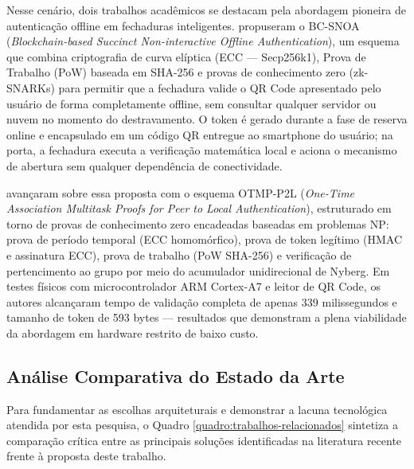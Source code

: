 Nesse cenário, dois trabalhos acadêmicos se destacam pela abordagem pioneira de autenticação offline em fechaduras inteligentes.  propuseram o BC-SNOA (\textit{Blockchain-based Succinct Non-interactive Offline Authentication}), um esquema que combina criptografia de curva elíptica (ECC --- Secp256k1), Prova de Trabalho (PoW) baseada em SHA-256 e provas de conhecimento zero (zk-SNARKs) para permitir que a fechadura valide o QR Code apresentado pelo usuário de forma completamente offline, sem consultar qualquer servidor ou nuvem no momento do destravamento. O token é gerado durante a fase de reserva online e encapsulado em um código QR entregue ao smartphone do usuário; na porta, a fechadura executa a verificação matemática local e aciona o mecanismo de abertura sem qualquer dependência de conectividade.

 avançaram sobre essa proposta com o esquema OTMP-P2L (\textit{One-Time Association Multitask Proofs for Peer to Local Authentication}), estruturado em torno de provas de conhecimento zero encadeadas baseadas em problemas NP: prova de período temporal (ECC homomórfico), prova de token legítimo (HMAC e assinatura ECC), prova de trabalho (PoW SHA-256) e verificação de pertencimento ao grupo por meio do acumulador unidirecional de Nyberg. Em testes físicos com microcontrolador ARM Cortex-A7 e leitor de QR Code, os autores alcançaram tempo de validação completa de apenas 339 milissegundos e tamanho de token de 593 bytes --- resultados que demonstram a plena viabilidade da abordagem em hardware restrito de baixo custo.


\subsection{Análise Comparativa do Estado da Arte}
\label{subsec:trabalhos-relacionados}

Para fundamentar as escolhas arquiteturais e demonstrar a lacuna tecnológica atendida por esta pesquisa, o Quadro \ref{quadro:trabalhos-relacionados} sintetiza a comparação crítica entre as principais soluções identificadas na literatura recente frente à proposta deste trabalho.

